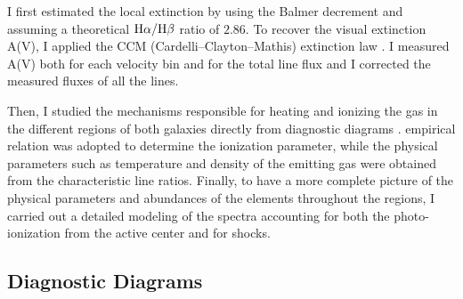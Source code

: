 \documentclass[../main.tex]{subfiles}
\begin{document}
I first estimated the local extinction by using the Balmer decrement and assuming a theoretical $\rm H\alpha/\rm H\beta$ ratio of $2.86$.
To recover the visual extinction A(V), I applied the CCM (Cardelli--Clayton--Mathis) extinction law \citep{Cardelli89}.
I measured A(V) both for each velocity bin and for the total line flux and I corrected the measured fluxes of all the lines.

Then, I studied the mechanisms responsible for heating and ionizing the gas in the different regions of both galaxies  directly from diagnostic diagrams \citep{Baldwin81,Veilleux87}. 
\citet{Penston90} empirical relation was adopted to determine the ionization parameter, while the physical parameters such as temperature and density of the emitting gas were obtained from the characteristic line ratios.
Finally, to have a more complete picture of the physical parameters and abundances of the elements throughout the regions, I carried out a detailed modeling of the spectra accounting for both the photo-ionization from the active center and for shocks.

\subsection{Diagnostic Diagrams}
\label{sec:diag}
\end{document}
